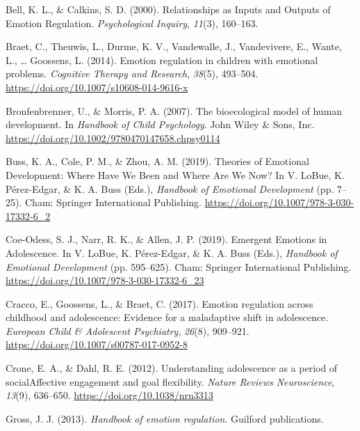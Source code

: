 \documentclass[
  english,
  man]{apa6}
\begin{document}
\leavevmode\hypertarget{ref-bellRelationshipsInputsOutputs2000}{}%
Bell, K. L., \& Calkins, S. D. (2000). Relationships as Inputs and Outputs of Emotion Regulation. \emph{Psychological Inquiry}, \emph{11}(3), 160--163.

\leavevmode\hypertarget{ref-braetEmotionRegulationChildren2014}{}%
Braet, C., Theuwis, L., Durme, K. V., Vandewalle, J., Vandevivere, E., Wante, L., \ldots{} Goossens, L. (2014). Emotion regulation in children with emotional problems. \emph{Cognitive Therapy and Research}, \emph{38}(5), 493--504. \url{https://doi.org/10.1007/s10608-014-9616-x}

\leavevmode\hypertarget{ref-bronfenbrennerBioecologicalModelHuman2007}{}%
Bronfenbrenner, U., \& Morris, P. A. (2007). The bioecological model of human development. In \emph{Handbook of Child Psychology}. John Wiley \& Sons, Inc. \url{https://doi.org/10.1002/9780470147658.chpsy0114}

\leavevmode\hypertarget{ref-bussTheoriesEmotionalDevelopment2019}{}%
Buss, K. A., Cole, P. M., \& Zhou, A. M. (2019). Theories of Emotional Development: Where Have We Been and Where Are We Now? In V. LoBue, K. Pérez-Edgar, \& K. A. Buss (Eds.), \emph{Handbook of Emotional Development} (pp. 7--25). Cham: Springer International Publishing. \url{https://doi.org/10.1007/978-3-030-17332-6_2}

\leavevmode\hypertarget{ref-coe-odessEmergentEmotionsAdolescence2019}{}%
Coe-Odess, S. J., Narr, R. K., \& Allen, J. P. (2019). Emergent Emotions in Adolescence. In V. LoBue, K. Pérez-Edgar, \& K. A. Buss (Eds.), \emph{Handbook of Emotional Development} (pp. 595--625). Cham: Springer International Publishing. \url{https://doi.org/10.1007/978-3-030-17332-6_23}

\leavevmode\hypertarget{ref-craccoEmotionRegulationChildhood2017}{}%
Cracco, E., Goossens, L., \& Braet, C. (2017). Emotion regulation across childhood and adolescence: Evidence for a maladaptive shift in adolescence. \emph{European Child \& Adolescent Psychiatry}, \emph{26}(8), 909--921. \url{https://doi.org/10.1007/s00787-017-0952-8}

\leavevmode\hypertarget{ref-croneUnderstandingAdolescencePeriod2012}{}%
Crone, E. A., \& Dahl, R. E. (2012). Understanding adolescence as a period of socialAffective engagement and goal flexibility. \emph{Nature Reviews Neuroscience}, \emph{13}(9), 636--650. \url{https://doi.org/10.1038/nrn3313}

\leavevmode\hypertarget{ref-grossHandbookEmotionRegulation2013}{}%
Gross, J. J. (2013). \emph{Handbook of emotion regulation}. Guilford publications.
\end{document}

